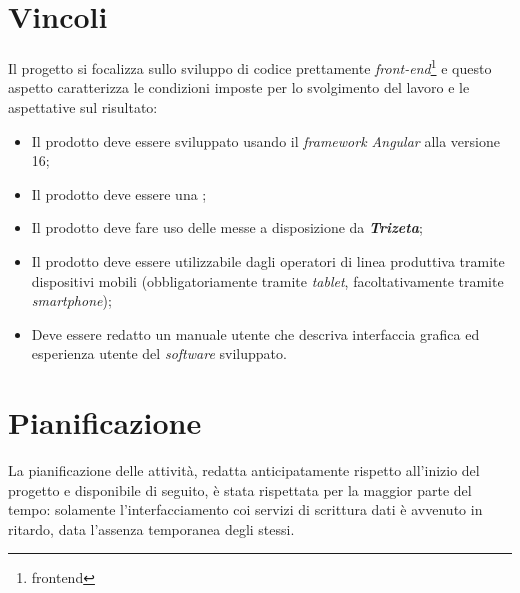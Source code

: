 \section{Vincoli}

Il progetto si focalizza sullo sviluppo di codice prettamente \textit{front-end}\footnote{\gls{frontend}} e questo aspetto caratterizza le condizioni imposte per lo svolgimento del lavoro e le aspettative sul risultato:
\begin{itemize}
    \item Il prodotto deve essere sviluppato usando il \textit{framework Angular} alla versione 16;
    \item Il prodotto deve essere una ;
    \item Il prodotto deve fare uso delle  messe a disposizione da \textit{\textbf{Trizeta}};
    \item Il prodotto deve essere utilizzabile dagli operatori di linea produttiva tramite dispositivi mobili (obbligatoriamente tramite \textit{tablet}, facoltativamente tramite \textit{smartphone});
    \item Deve essere redatto un manuale utente che  descriva interfaccia grafica ed esperienza utente del \textit{software} sviluppato.
\end{itemize}

\section{Pianificazione}
La pianificazione delle attività, redatta anticipatamente rispetto all'inizio del progetto e disponibile di seguito, è stata rispettata per la maggior parte del tempo: solamente l'interfacciamento coi servizi 
di scrittura dati è avvenuto in ritardo, data l'assenza temporanea degli stessi.

